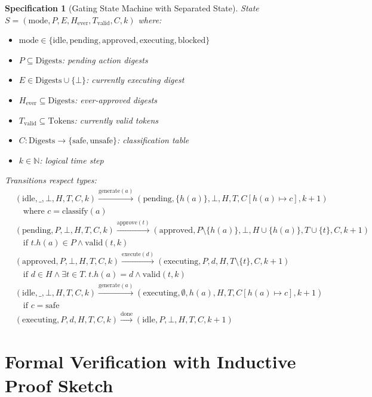 \documentclass[12pt]{article}
\newtheorem{spec}{Specification}[section]
\begin{document}
\begin{spec}[Gating State Machine with Separated State]
State $S = (\text{mode}, P, E, H_{\text{ever}}, T_{\text{valid}}, C, k)$ where:
\begin{itemize}
    \item $\text{mode} \in \{\text{idle}, \text{pending}, \text{approved}, \text{executing}, \text{blocked}\}$
    \item $P \subseteq \mathrm{Digests}$: pending action digests
    \item $E \in \mathrm{Digests} \cup \{\bot\}$: currently executing digest
    \item $H_{\text{ever}} \subseteq \mathrm{Digests}$: ever-approved digests
    \item $T_{\text{valid}} \subseteq \mathrm{Tokens}$: currently valid tokens
    \item $C: \mathrm{Digests} \to \{\text{safe}, \text{unsafe}\}$: classification table
    \item $k \in \mathbb{N}$: logical time step
\end{itemize}

Transitions respect types:
\begin{align*}
& (\text{idle}, \_, \bot, H, T, C, k) \xrightarrow{\text{generate}(a)} (\text{pending}, \{h(a)\}, \bot, H, T, C[h(a)\mapsto c], k+1) \\
& \quad \text{where } c = \text{classify}(a) \\
& (\text{pending}, P, \bot, H, T, C, k) \xrightarrow{\text{approve}(t)} (\text{approved}, P\setminus\{h(a)\}, \bot, H\cup\{h(a)\}, T\cup\{t\}, C, k+1) \\
& \quad \text{if } t.h(a) \in P \land \text{valid}(t,k) \\
& (\text{approved}, P, \bot, H, T, C, k) \xrightarrow{\text{execute}(d)} (\text{executing}, P, d, H, T\setminus\{t\}, C, k+1) \\
& \quad \text{if } d \in H \land \exists t\in T.\ t.h(a)=d \land \text{valid}(t,k) \\
& (\text{idle}, \_, \bot, H, T, C, k) \xrightarrow{\text{generate}(a)} (\text{executing}, \emptyset, h(a), H, T, C[h(a)\mapsto c], k+1) \\
& \quad \text{if } c = \text{safe} \\
& (\text{executing}, P, d, H, T, C, k) \xrightarrow{\text{done}} (\text{idle}, P, \bot, H, T, C, k+1)
\end{align*}
\end{spec}

\section{Formal Verification with Inductive Proof Sketch}
\end{document}
